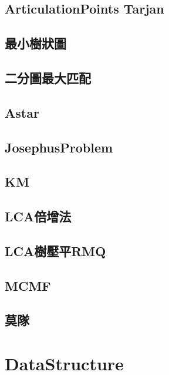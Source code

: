     \subsection{ArticulationPoints Tarjan}
        
    \subsection{最小樹狀圖}
        
    \subsection{二分圖最大匹配}
        
    \subsection{Astar}
        
    \subsection{JosephusProblem}
        
    \subsection{KM}
        
    \subsection{LCA倍增法}
        
    \subsection{LCA樹壓平RMQ}
        
    \subsection{MCMF}
        
    \subsection{莫隊}
        

\section{DataStructure}
